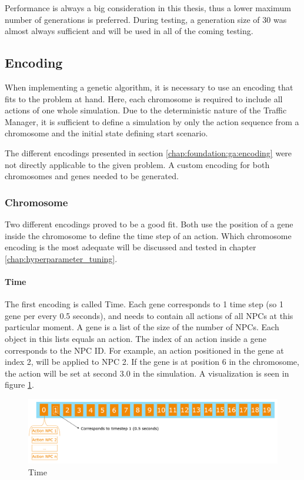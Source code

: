 Performance is always a big consideration in this thesis, thus a lower maximum number of generations is preferred. During testing, a generation size of 30 was almost always sufficient and will be used in all of the coming testing.

\subsection{Encoding}
When implementing a genetic algorithm, it is necessary to use an encoding that fits to the problem at hand. 
Here, each chromosome is required to include all actions of one whole simulation. Due to the deterministic nature of the Traffic Manager, it is sufficient to define a simulation by only the action sequence from a chromosome and the initial state defining start scenario.

The different encodings presented in section \ref{chap:foundation:ga:encoding} were not directly applicable to the given problem. A custom encoding for both chromosomes and genes needed to be generated.

\subsubsection{Chromosome}
Two different encodings proved to be a good fit. Both use the position of a gene inside the chromosome to define the time step of an action. Which chromosome encoding is the most adequate will be discussed and tested in chapter \ref{chap:hyperparameter_tuning}.

\paragraph{Time}
The first encoding is called Time. Each gene corresponds to 1 time step (so 1 gene per every 0.5 seconds), and needs to contain all actions of all NPCs at this particular moment. A gene is a list of the size of the number of NPCs. Each object in this lists equals an action. The index of an action inside a gene corresponds to the NPC ID. For example, an action positioned in the gene at index 2, will be applied to NPC 2. If the gene is at position 6 in the chromosome, the action will be set at second 3.0 in the simulation. A visualization is seen in figure \ref{figure:encoding:chromosome:time}.

\begin{figure}[ht] 
	\includegraphics[width=1\linewidth]{figures/time_encoding}
	\caption{Time}
	\label{figure:encoding:chromosome:time}
\end{figure}


